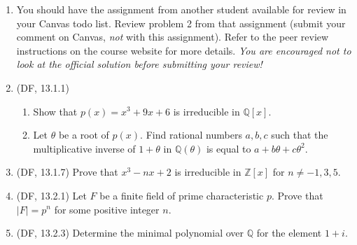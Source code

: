 \documentclass{amsart}
\theoremstyle{definition}
\newcommand{\Zz}{\mathbb{Z}}
\newcommand{\Qq}{\mathbb{Q}}
\begin{document}
\begin{enumerate}
\item You should have the assignment from another student available for review in your Canvas todo list. Review problem 2 from that assignment (submit your comment on Canvas, \emph{not} with this assignment). Refer to the peer review instructions on the course website for more details. \emph{You are encouraged not to look at the official solution before submitting your review!}
\item (DF, 13.1.1)
    \begin{enumerate}
    \item Show that $p (x) = x^3 + 9x + 6$ is irreducible in $\Qq[x]$.
    \item Let $\theta$ be a root of $p (x)$. Find rational numbers $a, b, c$ such that the multiplicative inverse of $1 + \theta$ in $\Qq (\theta)$ is equal to $a + b\theta + c\theta^2$.
    \end{enumerate}
\item (DF, 13.1.7) Prove that $x^3 - nx + 2$ is irreducible in $\Zz[x]$ for $n \neq -1, 3, 5$.
\item (DF, 13.2.1) Let $F$ be a finite field of prime characteristic $p$. Prove that $|F| = p^n$ for some positive integer $n$.
\item (DF, 13.2.3) Determine the minimal polynomial over $\Qq$ for the element $1 + i$.
\end{enumerate}
\end{document}
